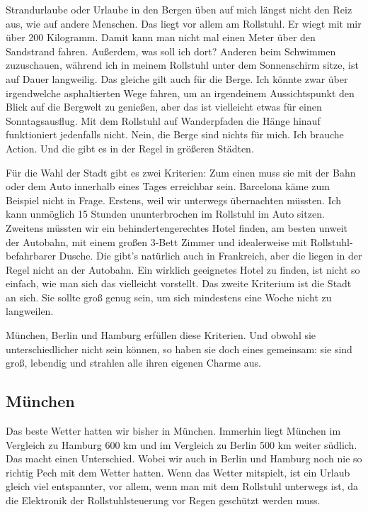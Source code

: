 \documentclass[fontsize=14pt,a4paper,headinclude,DIV=calc,automark]{scrbook}
\begin{document}
Strandurlaube oder Urlaube in den Bergen üben auf mich längst nicht den Reiz aus, wie auf andere Menschen. Das liegt vor allem am Rollstuhl. Er wiegt mit mir über 200 Kilogramm. Damit kann man nicht mal einen Meter über den Sandstrand fahren. Außerdem, was soll ich dort? Anderen beim Schwimmen zuzuschauen, während ich in meinem Rollstuhl unter dem Sonnenschirm sitze, ist auf Dauer langweilig. Das gleiche gilt auch für die Berge. Ich könnte zwar über irgendwelche asphaltierten Wege fahren, um an irgendeinem Aussichtspunkt den Blick auf die Bergwelt zu genießen, aber das ist vielleicht etwas für einen Sonntagsausflug. Mit dem Rollstuhl auf Wanderpfaden die Hänge hinauf funktioniert jedenfalls nicht. Nein, die Berge sind nichts für mich. Ich brauche Action. Und die gibt es in der Regel in größeren Städten.

Für die Wahl der Stadt gibt es zwei Kriterien: Zum einen muss sie mit der Bahn oder dem Auto innerhalb eines Tages erreichbar sein. Barcelona käme zum Beispiel nicht in Frage. Erstens, weil wir unterwegs übernachten müssten. Ich kann unmöglich 15 Stunden ununterbrochen im Rollstuhl im Auto sitzen. Zweitens müssten wir ein behindertengerechtes Hotel finden, am besten unweit der Autobahn, mit einem großen 3-Bett Zimmer und idealerweise mit Rollstuhl-befahrbarer Dusche. Die gibt’s natürlich auch in Frankreich, aber die liegen in der Regel nicht an der Autobahn. Ein wirklich geeignetes Hotel zu finden, ist nicht so einfach, wie man sich das vielleicht vorstellt. Das zweite Kriterium ist die Stadt an sich. Sie sollte groß genug sein, um sich mindestens eine Woche nicht zu langweilen. 

München, Berlin und Hamburg erfüllen diese Kriterien. Und obwohl sie unterschiedlicher nicht sein können, so haben sie doch eines gemeinsam: sie sind groß, lebendig und strahlen alle ihren eigenen Charme aus.

\subsection{München}

Das beste Wetter hatten wir bisher in München. Immerhin liegt München im Vergleich zu Hamburg 600 km und im Vergleich zu Berlin 500 km weiter südlich. Das macht einen Unterschied. Wobei wir auch in Berlin und Hamburg noch nie so richtig Pech mit dem Wetter hatten. Wenn das Wetter mitspielt, ist ein Urlaub gleich viel entspannter, vor allem, wenn man mit dem Rollstuhl unterwegs ist, da die Elektronik der Rollstuhlsteuerung vor Regen geschützt werden muss.
\end{document}
